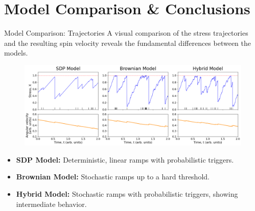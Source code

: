 \section{Model Comparison \& Conclusions}

\begin{frame}{Model Comparison: Trajectories}
    A visual comparison of the stress trajectories and the resulting spin velocity reveals the fundamental differences between the models.

    \begin{figure}
        \centering
        \includegraphics[width=\linewidth]{assets/comparison.png}
    \end{figure}
    
    \vspace{-1em}

    \begin{itemize}
        \item \textbf{SDP Model:} Deterministic, linear ramps with probabilistic triggers.
        \item \textbf{Brownian Model:} Stochastic ramps up to a hard threshold.
        \item \textbf{Hybrid Model:} Stochastic ramps with probabilistic triggers, showing intermediate behavior.
    \end{itemize}
\end{frame}

